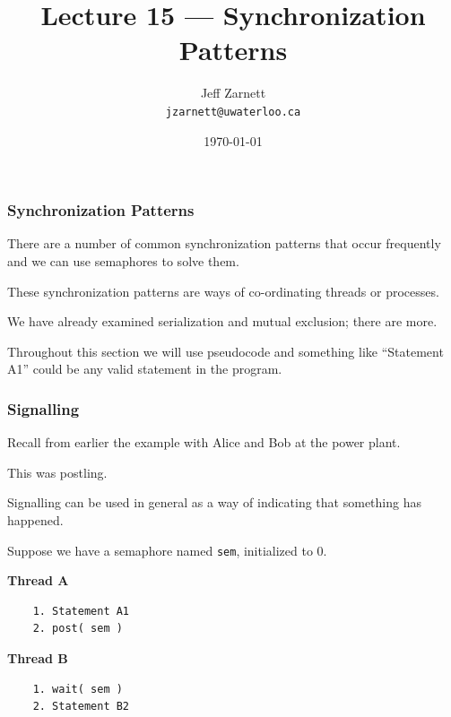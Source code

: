 

\title{Lecture 15 --- Synchronization Patterns }

\author{Jeff Zarnett \\ \small \texttt{jzarnett@uwaterloo.ca}}
\date{\today}




\begin{frame}
  \titlepage

 \end{frame}

\begin{frame}
\frametitle{Synchronization Patterns}


There are a number of common synchronization patterns that occur frequently and we can use semaphores to solve them. 

These synchronization patterns are ways of co-ordinating threads or processes. 

We have already examined serialization and mutual exclusion; there are more. 

Throughout this section we will use pseudocode and something like ``Statement A1'' could be any valid statement in the program.

\end{frame}

\begin{frame}[fragile]
\frametitle{Signalling}

Recall from earlier the example with Alice and Bob at the power plant. 

This was postling.

Signalling can be used in general as a way of indicating that something has happened. 

Suppose we have a semaphore named \texttt{sem}, initialized to 0.

\begin{multicols}{2}
\textbf{Thread A}
  \begin{verbatim}
	1. Statement A1
	2. post( sem )
  \end{verbatim}
\columnbreak
\textbf{Thread B}
  \begin{verbatim}
	1. wait( sem )
	2. Statement B2
  \end{verbatim}
\end{multicols}
\vspace{-2em}


\end{frame}


